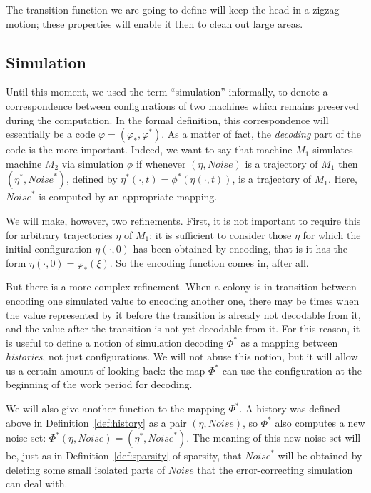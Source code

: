 \documentclass[12pt]{memoir}
\newcommand{\Noise}{\mathit{Noise}}
\begin{document}
The transition function we are going to define will keep the head in a zigzag motion;
these properties will enable it then to clean out large areas.


\subsection{Simulation}

Until this moment, we used the term ``simulation'' informally, to denote
a correspondence between configurations of
two machines which remains preserved during the computation.
In the formal definition, this correspondence will essentially be a code
\( \varphi=(\varphi_{*},\varphi^{*}) \).
As a matter of fact, the \emph{decoding} part of the code is the more important.
Indeed, we want to say that machine \( M_{1} \) simulates machine \( M_{2} \) via
simulation \( \phi \) if whenever \( (\eta, \Noise) \) is a trajectory of \( M_{1} \) 
then \( (\eta^{*},\Noise^{*}) \),
defined by \( \eta^{*}(\cdot,t)=\phi^{*}(\eta(\cdot,t)) \), is a
trajectory of \( M_{1} \).
Here, \( \Noise^{*} \) is computed by an appropriate mapping.

We will make, however, two refinements.
First, it is not important to require this for arbitrary trajectories \( \eta \) of \( M_{1} \):
it is sufficient to consider those \( \eta \) for which the initial configuration
 \( \eta(\cdot,0) \) has been obtained by encoding, that is it has the form 
\( \eta(\cdot,0)=\varphi_{*}(\xi) \).
So the encoding function comes in, after all.

But there is a more complex refinement.
When a colony is in transition between encoding one simulated value to encoding another one,
there may be times when the value represented by it before the transition
is already not decodable from it, and the value after the transition is not yet decodable from it.
For this reason, it is useful to define a notion of simulation decoding \( \Phi^{*} \)
as a mapping between \emph{histories}, not just configurations.
We will not abuse this notion, but it will allow us a certain amount of looking back:
the map \( \Phi^{*} \) can use the configuration at the beginning of the work period for decoding.

We will also give another function to the mapping \( \Phi^{*} \).
A history was defined above in Definition~\ref{def:history} 
as a pair \( (\eta,\Noise) \),
so \( \Phi^{*} \) also computes a new noise set:
\( \Phi^{*}(\eta,\Noise)=(\eta^{*},\Noise^{*}) \).
The meaning of this new noise set will be, just as in Definition~\ref{def:sparsity} of sparsity,
that 
\( \Noise^{*} \) will be obtained by deleting some small isolated parts of \( \Noise \) that the 
error-correcting simulation can deal with.
\end{document}

